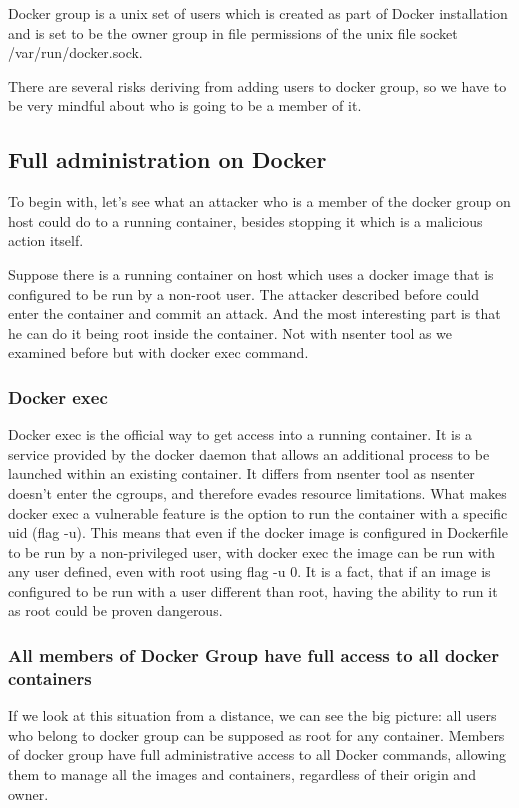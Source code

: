 Docker group is a unix set of users which is created as part of Docker installation and is set to be the owner group in file permissions of the unix file socket /var/run/docker.sock. \cite{dockergroup}

There are several risks deriving from adding users to docker group, so we have to be very mindful about who is going to be a member of it.

\subsection{Full administration on Docker}
To begin with, let's see what an attacker who is a member of the docker group on host could do to a running container, besides stopping it which is a malicious action itself. 

Suppose there is a running container on host which uses a docker image that is configured to be run by a non-root user. The attacker described before could enter the container and commit an attack. And the most interesting part is that he can do it being root inside the container. Not with nsenter tool as we examined before but with docker exec command.

\subsubsection{Docker exec}
Docker exec is the official way to get access into a running container. It is a service provided by the docker daemon that allows an additional process to be launched within an existing container. It differs from nsenter tool as nsenter doesn't enter the cgroups, and therefore evades resource limitations.
What makes docker exec a vulnerable feature is the option to run the container with a specific uid (flag -u). This means that even if the docker image is configured in Dockerfile to be run by a non-privileged user, with docker exec the image can be run with any user defined, even with root using flag -u 0. It is a fact, that if an image is configured to be run with a user different than root, having the ability to run it as root could be proven dangerous.

\subsubsection{All members of Docker Group have full access to all docker containers}
If we look at this situation from a distance, we can see the big picture: all users who belong to docker group can be supposed as root for any container. Members of docker group have full administrative access to all Docker commands, allowing them to manage all the images and containers, regardless of their origin and owner.

